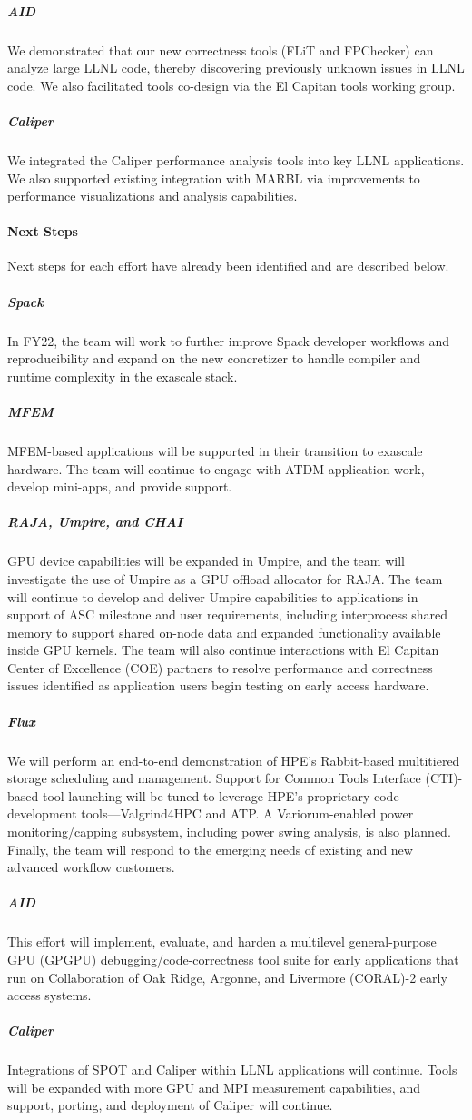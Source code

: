 \subparagraph{AID}
%
We demonstrated that our new correctness tools (FLiT and FPChecker) can analyze large LLNL code, thereby discovering previously unknown issues in LLNL code. We also facilitated tools co-design via the El Capitan tools working group.

\subparagraph{Caliper}
We integrated the Caliper performance analysis tools into key LLNL applications. We also supported existing integration with MARBL via improvements to performance visualizations and analysis capabilities.


\paragraph{Next Steps} %
Next steps for each effort have already been identified and are described below.

\subparagraph{Spack}
 In FY22, the team will work to further improve Spack developer workflows and reproducibility and expand on the new concretizer to handle compiler and runtime complexity in the exascale stack.

\subparagraph{MFEM}
%
MFEM-based applications will be supported in their transition to exascale hardware.
The team will continue to engage with ATDM application work, develop mini-apps, and provide support.


\subparagraph{RAJA, Umpire, and CHAI}


GPU device capabilities will be expanded in Umpire, and the team will
investigate the use of Umpire as a GPU offload allocator for RAJA.
The team will continue to develop and deliver Umpire capabilities to applications in support of ASC milestone and user requirements, including interprocess shared memory to support shared on-node data and expanded functionality available inside GPU kernels.
The team will also continue interactions with El Capitan Center of Excellence (COE) partners to resolve performance and correctness issues identified as application users begin testing on early access hardware.


\subparagraph{Flux}
We will perform an end-to-end demonstration of HPE's Rabbit-based multitiered storage scheduling and management.
Support for Common Tools Interface (CTI)-based tool launching will be tuned to leverage HPE's proprietary code-development tools---Valgrind4HPC and ATP.
A Variorum-enabled power monitoring/capping subsystem, including power swing analysis, is also planned.
Finally, the team will respond to the emerging needs of existing and new advanced workflow customers.


\subparagraph{AID}
This effort will implement, evaluate, and harden a multilevel general-purpose GPU (GPGPU) debugging/code-correctness tool suite for early applications that run on Collaboration of Oak Ridge, Argonne, and Livermore (CORAL)-2 early access systems.

\subparagraph{Caliper}
Integrations of SPOT and Caliper within LLNL applications will continue. Tools will be expanded with more GPU and MPI measurement capabilities, and support, porting, and deployment of Caliper will continue.
